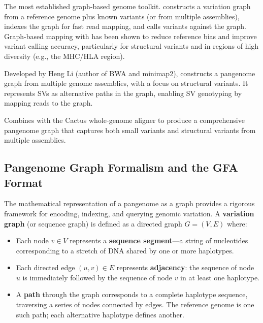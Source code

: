 \begin{description}[style=nextline, itemsep=3pt]
  \item[\software{vg} (variation graph)] The most established graph-based genome toolkit.  constructs a variation graph from a reference genome plus known variants (or from multiple assemblies), indexes the graph for fast read mapping, and calls variants against the graph. Graph-based mapping with  has been shown to reduce reference bias and improve variant calling accuracy, particularly for structural variants and in regions of high diversity (e.g., the MHC/HLA region).

  \item[\software{minigraph}] Developed by Heng Li (author of BWA and minimap2),  constructs a pangenome graph from multiple genome assemblies, with a focus on structural variants. It represents SVs as alternative paths in the graph, enabling SV genotyping by mapping reads to the graph.

  \item[\software{minigraph-cactus}] Combines  with the Cactus whole-genome aligner to produce a comprehensive pangenome graph that captures both small variants and structural variants from multiple assemblies.
\end{description}

\subsection{Pangenome Graph Formalism and the GFA Format}
\label{subsec:emerging:graph-formalism}

The mathematical representation of a pangenome as a graph provides a rigorous framework for encoding, indexing, and querying genomic variation. A \textbf{variation graph} (or sequence graph) is defined as a directed graph $G = (V, E)$ where:

\begin{itemize}[itemsep=2pt]
  \item Each node $v \in V$ represents a \textbf{sequence segment}---a string of nucleotides corresponding to a stretch of DNA shared by one or more haplotypes.
  \item Each directed edge $(u, v) \in E$ represents \textbf{adjacency}: the sequence of node $u$ is immediately followed by the sequence of node $v$ in at least one haplotype.
  \item A \textbf{path} through the graph corresponds to a complete haplotype sequence, traversing a series of nodes connected by edges. The reference genome is one such path; each alternative haplotype defines another.
\end{itemize}

